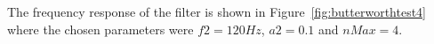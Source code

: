 \documentclass{article}
\begin{document}
The frequency response of the filter is shown in Figure~\ref{fig:butterworthtest4} 
where the chosen parameters were $f2 = 120Hz$, $a2 = 0.1$ and $nMax = 4$.
\begin{figure}
\centering
{}

\end{figure}
\end{document}
